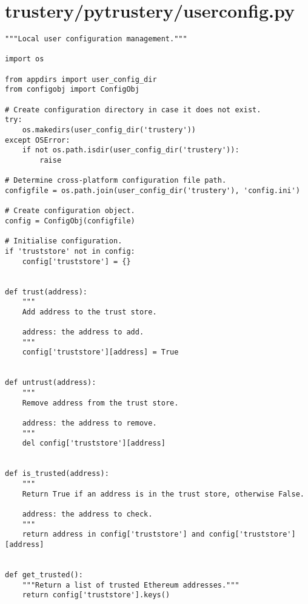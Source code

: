 \documentclass[12pt]{report}
\begin{document}
	\section{trustery/pytrustery/userconfig.py}
	\begin{lstlisting}
"""Local user configuration management."""

import os

from appdirs import user_config_dir
from configobj import ConfigObj

# Create configuration directory in case it does not exist.
try:
    os.makedirs(user_config_dir('trustery'))
except OSError:
    if not os.path.isdir(user_config_dir('trustery')):
        raise

# Determine cross-platform configuration file path.
configfile = os.path.join(user_config_dir('trustery'), 'config.ini')

# Create configuration object.
config = ConfigObj(configfile)

# Initialise configuration.
if 'truststore' not in config:
    config['truststore'] = {}


def trust(address):
    """
    Add address to the trust store.

    address: the address to add.
    """
    config['truststore'][address] = True


def untrust(address):
    """
    Remove address from the trust store.

    address: the address to remove.
    """
    del config['truststore'][address]


def is_trusted(address):
    """
    Return True if an address is in the trust store, otherwise False.

    address: the address to check.
    """
    return address in config['truststore'] and config['truststore'][address]


def get_trusted():
    """Return a list of trusted Ethereum addresses."""
    return config['truststore'].keys()
	\end{lstlisting}
\end{document}
